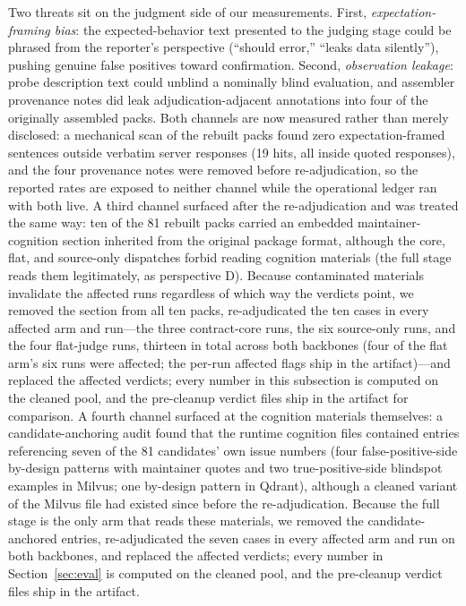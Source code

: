 \documentclass[acmsmall,screen,review,anonymous]{acmart}
\begin{document}
Two threats sit on the judgment side of our measurements. First, \emph{expectation-framing bias}: the expected-behavior text presented to the judging stage could be phrased from the reporter's perspective (``should error,'' ``leaks data silently''), pushing genuine false positives toward confirmation. Second, \emph{observation leakage}: probe description text could unblind a nominally blind evaluation, and assembler provenance notes did leak adjudication-adjacent annotations into four of the originally assembled packs. Both channels are now measured rather than merely disclosed: a mechanical scan of the rebuilt packs found zero expectation-framed sentences outside verbatim server responses (19 hits, all inside quoted responses), and the four provenance notes were removed before re-adjudication, so the reported rates are exposed to neither channel while the operational ledger ran with both live. A third channel surfaced after the re-adjudication and was treated the same way: ten of the 81 rebuilt packs carried an embedded maintainer-cognition section inherited from the original package format, although the core, flat, and source-only dispatches forbid reading cognition materials (the full stage reads them legitimately, as perspective D). Because contaminated materials invalidate the affected runs regardless of which way the verdicts point, we removed the section from all ten packs, re-adjudicated the ten cases in every affected arm and run---the three contract-core runs, the six source-only runs, and the four flat-judge runs, thirteen in total across both backbones (four of the flat arm's six runs were affected; the per-run affected flags ship in the artifact)---and replaced the affected verdicts; every number in this subsection is computed on the cleaned pool, and the pre-cleanup verdict files ship in the artifact for comparison. A fourth channel surfaced at the cognition materials themselves: a candidate-anchoring audit found that the runtime cognition files contained entries referencing seven of the 81 candidates' own issue numbers (four false-positive-side by-design patterns with maintainer quotes and two true-positive-side blindspot examples in Milvus; one by-design pattern in Qdrant), although a cleaned variant of the Milvus file had existed since before the re-adjudication. Because the full stage is the only arm that reads these materials, we removed the candidate-anchored entries, re-adjudicated the seven cases in every affected arm and run on both backbones, and replaced the affected verdicts; every number in Section~\ref{sec:eval} is computed on the cleaned pool, and the pre-cleanup verdict files ship in the artifact.
\end{document}
